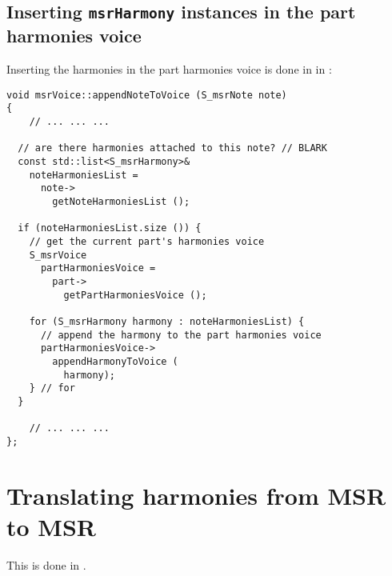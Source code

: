 \subsection{Inserting {\tt msrHarmony} instances in the part harmonies voice}

Inserting the harmonies in the part harmonies voice is done in  in :
\begin{lstlisting}[language=CPlusPlus]
void msrVoice::appendNoteToVoice (S_msrNote note)
{
	// ... ... ...

  // are there harmonies attached to this note? // BLARK
  const std::list<S_msrHarmony>&
    noteHarmoniesList =
      note->
        getNoteHarmoniesList ();

  if (noteHarmoniesList.size ()) {
    // get the current part's harmonies voice
    S_msrVoice
      partHarmoniesVoice =
        part->
          getPartHarmoniesVoice ();

    for (S_msrHarmony harmony : noteHarmoniesList) {
      // append the harmony to the part harmonies voice
      partHarmoniesVoice->
        appendHarmonyToVoice (
          harmony);
    } // for
  }

	// ... ... ...
};
\end{lstlisting}


\section{Translating harmonies from MSR to MSR}

This is done in \msrToMsr{}.

